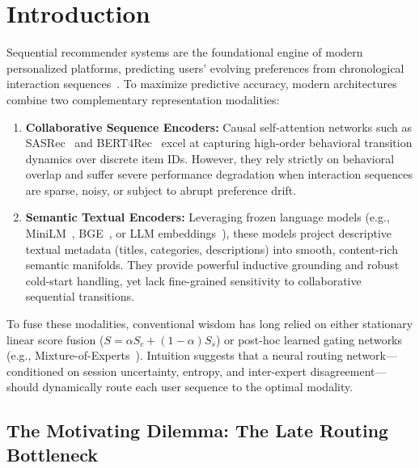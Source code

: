 
\section{Introduction}
\label{sec:intro}

Sequential recommender systems are the foundational engine of modern personalized platforms, predicting users' evolving preferences from chronological interaction sequences~\cite{kang2018self,sun2019bert4rec}. To maximize predictive accuracy, modern architectures combine two complementary representation modalities:
\begin{enumerate}[leftmargin=*]
    \item \textbf{Collaborative Sequence Encoders:} Causal self-attention networks such as SASRec~\cite{kang2018self} and BERT4Rec~\cite{sun2019bert4rec} excel at capturing high-order behavioral transition dynamics over discrete item IDs. However, they rely strictly on behavioral overlap and suffer severe performance degradation when interaction sequences are sparse, noisy, or subject to abrupt preference drift.
    \item \textbf{Semantic Textual Encoders:} Leveraging frozen language models (e.g., MiniLM~\cite{wang2020minilm}, BGE~\cite{xiao2023bge}, or LLM embeddings~\cite{hou2022towards,petrov2023effective}), these models project descriptive textual metadata (titles, categories, descriptions) into smooth, content-rich semantic manifolds. They provide powerful inductive grounding and robust cold-start handling, yet lack fine-grained sensitivity to collaborative sequential transitions.
\end{enumerate}

To fuse these modalities, conventional wisdom has long relied on either stationary linear score fusion ($S = \alpha S_c + (1-\alpha) S_s$) or post-hoc learned gating networks (e.g., Mixture-of-Experts~\cite{shazeer2017outrageously,ma2018modeling}). Intuition suggests that a neural routing network---conditioned on session uncertainty, entropy, and inter-expert disagreement---should dynamically route each user sequence to the optimal modality.

\subsection{The Motivating Dilemma: The Late Routing Bottleneck}
\label{sec:intro_premise}

